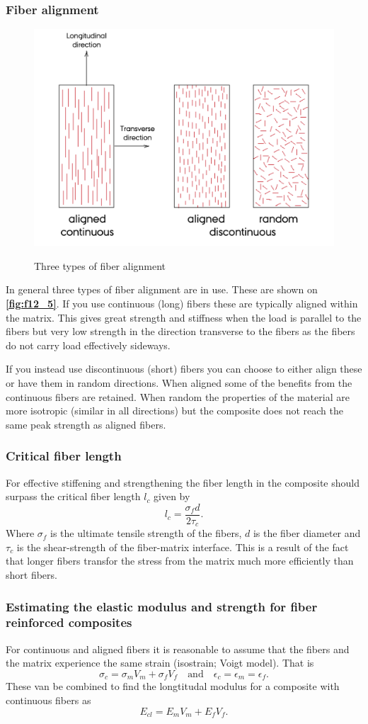 \subsubsection{Fiber alignment}
\begin{figure} [ht]
  \centering
  \caption{Three types of fiber alignment}
  \includegraphics[width=0.5\linewidth]{./figures/f12_5.png}
  \label{fig:f12_5}
\end{figure}
In general three types of fiber alignment are in use. These are shown on \textbf{\autoref{fig:f12_5}}. If you use continuous (long) fibers these are typically aligned within the matrix. This gives great strength and stiffness when the load is parallel to the fibers but very low strength in the direction transverse to the fibers as the fibers do not carry load effectively sideways.

If you instead use discontinuous (short) fibers you can choose to either align these or have them in random directions. When aligned some of the benefits from the continuous fibers are retained. When random the properties of the material are more isotropic (similar in all directions) but the composite does not reach the same peak strength as aligned fibers.

\subsubsection{Critical fiber length}
For effective stiffening and strengthening the fiber length in the composite should surpass the critical fiber length $l_c$ given by
\[ 
l_c = \frac{\sigma_f d}{2 \tau_c}
.\]
Where $\sigma_f$ is the ultimate tensile strength of the fibers, $d$ is the fiber diameter and $\tau_c$ is the shear-strength of the fiber-matrix interface. This is a result of the fact that longer fibers transfor the stress from the matrix much more efficiently than short fibers.

\subsubsection{Estimating the elastic modulus and strength for fiber reinforced composites}
For continuous and aligned fibers it is reasonable to assume that the fibers and the matrix experience the same strain (isostrain; Voigt model). That is
\[ 
\sigma_c = \sigma_m V_m + \sigma_f V_f \quad \text{and} \quad \epsilon_c = \epsilon_m = \epsilon_f
.\]
These van be combined to find the longtitudal modulus for a composite with continuous fibers as
\[ 
E_{cl} = E_m V_m + E_f V_f
.\]

